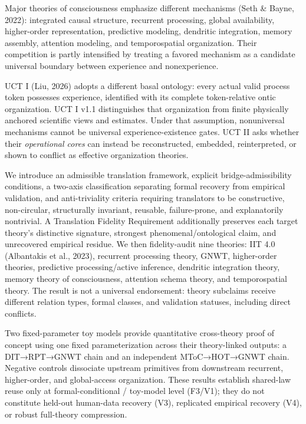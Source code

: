 \documentclass[
  11pt,
  a4paper,
]{article}
\begin{document}
Major theories of consciousness emphasize different mechanisms (Seth \&
Bayne, 2022): integrated causal structure, recurrent processing, global
availability, higher-order representation, predictive modeling,
dendritic integration, memory assembly, attention modeling, and
temporospatial organization. Their competition is partly intensified by
treating a favored mechanism as a candidate universal boundary between
experience and nonexperience.

UCT I (Liu, 2026) adopts a different basal ontology: every actual valid
process token possesses experience, identified with its complete
token-relative ontic organization. UCT I v1.1 distinguishes that
organization from finite physically anchored scientific views and
estimates. Under that assumption, nonuniversal mechanisms cannot be
universal experience-existence gates. UCT II asks whether their
\emph{operational cores} can instead be reconstructed, embedded,
reinterpreted, or shown to conflict as effective organization theories.

We introduce an admissible translation framework, explicit
bridge-admissibility conditions, a two-axis classification separating
formal recovery from empirical validation, and anti-triviality criteria
requiring translators to be constructive, non-circular, structurally
invariant, reusable, failure-prone, and explanatorily nontrivial. A
Translation Fidelity Requirement additionally preserves each target
theory's distinctive signature, strongest phenomenal/ontological claim,
and unrecovered empirical residue. We then fidelity-audit nine theories:
IIT 4.0 (Albantakis et al., 2023), recurrent processing theory, GNWT,
higher-order theories, predictive processing/active inference, dendritic
integration theory, memory theory of consciousness, attention schema
theory, and temporospatial theory. The result is not a universal
endorsement: theory subclaims receive different relation types, formal
classes, and validation statuses, including direct conflicts.

Two fixed-parameter toy models provide quantitative cross-theory proof
of concept using one fixed parameterization across their theory-linked
outputs: a DIT→RPT→GNWT chain and an independent MToC→HOT→GNWT chain.
Negative controls dissociate upstream primitives from downstream
recurrent, higher-order, and global-access organization. These results
establish shared-law reuse only at formal-conditional / toy-model level
(F3/V1); they do not constitute held-out human-data recovery (V3),
replicated empirical recovery (V4), or robust full-theory compression.
\end{document}
